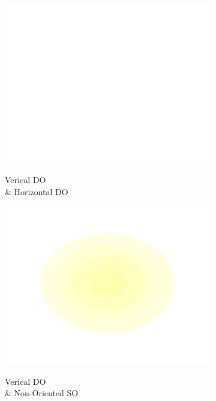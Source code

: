 \documentclass[journal,onecolumn]{IEEEtran}
\begin{document}
\begin{figure}[h]
\begin{subfigure}[b]{0.2\textwidth}
            \centering
            \captionsetup{justification=centering}
            \includegraphics[width=.85\linewidth]{map-j_blank}
            \caption{\\ Verical DO \\ \& Horizontal DO}
    \end{subfigure}%
    \begin{subfigure}[b]{0.2\textwidth}
            \centering
            \captionsetup{justification=centering}
            \includegraphics[width=.85\linewidth]{map-j_1_4}
            \caption{\\ Verical DO \\ \& Non-Oriented SO}
    \end{subfigure}%
    \par \bigskip
    \begin{subfigure}[b]{0.2\textwidth}
            \centering
            \captionsetup{justification=centering}

\end{subfigure}
\end{figure}
\end{document}
